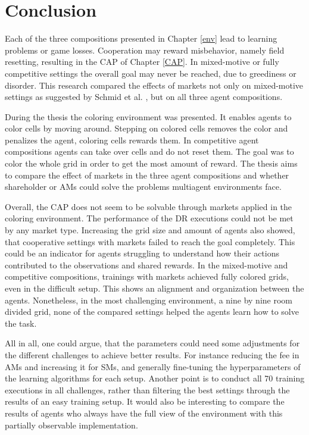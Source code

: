 \chapter{Conclusion}\label{sec:Conclusion}
Each of the three compositions presented in Chapter \ref{env} lead to learning problems or game losses. Cooperation may reward misbehavior, namely field resetting, resulting in the CAP of Chapter \ref{CAP}. In mixed-motive or fully competitive settings the overall goal may never be reached, due to greediness or disorder. This research compared the effects of markets not only on mixed-motive settings as suggested by Schmid et al. \cite{scbe21}, but on all three agent compositions.

During the thesis the coloring environment was presented. It enables agents to color cells by moving around. Stepping on colored cells removes the color and penalizes the agent, coloring cells rewards them. In competitive agent compositions agents can take over cells and do not reset them. The goal was to color the whole grid in order to get the most amount of reward. The thesis aims to compare the effect of markets in the three agent compositions and whether shareholder or AMs could solve the problems multiagent environments face.

Overall, the CAP does not seem to be solvable through markets applied in the coloring environment. The performance of the DR executions could not be met by any market type. Increasing the grid size and amount of agents also showed, that cooperative settings with markets failed to reach the goal completely. This could be an indicator for agents struggling to understand how their actions contributed to the observations and shared rewards. In the mixed-motive and competitive compositions, trainings with markets achieved fully colored grids, even in the difficult setup. This shows an alignment and organization between the agents. Nonetheless, in the most challenging environment, a nine by nine room divided grid, none of the compared settings helped the agents learn how to solve the task.

All in all, one could argue, that the parameters could need some adjustments for the different challenges to achieve better results. For instance reducing the fee in AMs and increasing it for SMs, and generally fine-tuning the hyperparameters of the learning algorithms for each setup. Another point is to conduct all 70 training executions in all challenges, rather than filtering the best settings through the results of an easy training setup. It would also be interesting to compare the results of agents who always have the full view of the environment with this partially observable implementation.

